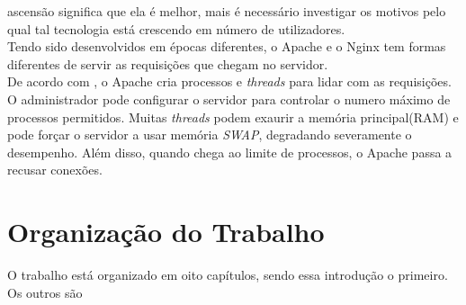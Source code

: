 ascensão significa que ela é melhor, mais é necessário investigar os motivos 
pelo qual tal tecnologia está crescendo em número de utilizadores.\\
Tendo sido desenvolvidos em épocas diferentes, o Apache e o Nginx tem formas diferentes de servir as requisições que chegam no servidor.\\
De acordo com , o Apache cria processos e \textit{threads} para lidar com as requisições. O administrador pode configurar o servidor para controlar o numero máximo de processos permitidos. Muitas \textit{threads} podem exaurir a memória principal(RAM) e pode forçar o servidor a usar memória \textit{SWAP}, degradando severamente o desempenho. Além disso, quando chega ao limite de processos, o Apache passa a recusar conexões.
\section{Organização do Trabalho}
O trabalho está organizado em oito capítulos, sendo essa introdução o primeiro. 
Os outros são